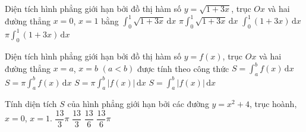 

\begin{ex}%
	Diện tích hình phẳng giới hạn bởi đồ thị hàm số $y=\sqrt{1+3x}$,  trục $Ox$ và hai đường thẳng $x=0$, $x=1$ bằng
	\choice 
		{\True $\displaystyle\int_0^1  \sqrt{1+3x}\mathrm{\,d}x$}
		 {$\pi \displaystyle\int_0^1 \sqrt{1+3x}\mathrm{\,d}x$}
		 {$\displaystyle\int_0^1 (1+3x)\mathrm{\,d}x$}
		{$\pi\displaystyle\int_0^1  (1+3x)\mathrm{\,d}x$}
\end{ex}

\begin{ex}%
	Diện tích hình phẳng giới hạn bởi đồ thị hàm số $y=f(x)$, trục $Ox$ và hai đường thẳng $x=a$, $x=b$  $(a < b)$ được tính theo công thức
	 \choice
		{$S=\displaystyle\int_a^b  f(x) \mathrm{\,d}x$}
		{$S=\pi \displaystyle\int_a^b f(x)  \mathrm{\,d}x$}
		{$S=\pi  \displaystyle\int_a^b|f(x)|\mathrm{\,d}x$}
		{\True $S=\displaystyle\int_a^b|f(x)|\mathrm{\,d}x$} 
\end{ex}

\begin{ex}%
	Tính diện tích $S$ của  hình phẳng giới hạn bởi các đường $y=x^2+4$, trục hoành, $x=0$, $x=1$.
	\choice 
		{$\dfrac{13}{3} \pi$} 
		{\True $\dfrac{13}{3}$} 
		{$\dfrac{13}{6}$} 
		 {$\dfrac{13}{6} \pi$}
\end{ex}


